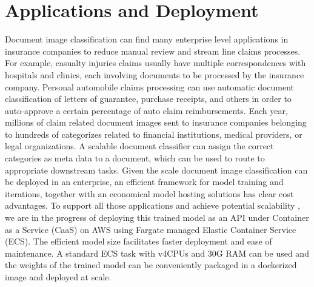 \section{Applications and Deployment}
Document image classification can find many enterprise level applications in insurance companies to reduce manual review and stream line claims processes. For example, casualty injuries claims usually have multiple correspondences with hospitals and clinics, each involving documents to be processed by the insurance company. Personal automobile claims processing can use automatic document classification of letters of guarantee, purchase receipts, and others in order to auto-approve a certain percentage of auto claim reimbursements. Each year, millions of claim related document images sent to insurance companies belonging to hundreds of categorizes related to financial institutions, medical providers, or legal organizations. A scalable document classifier can assign the correct categories as meta data to a document, which can be used to route to appropriate downstream tasks. Given the scale document image classification can be deployed in an enterprise, 
an efficient framework for model training and iterations, together with an economical model hosting solutions has clear cost advantages.  
To support all those applications and achieve potential scalability , we are in the progress of deploying this trained model as an API under Container as a Service (CaaS) on AWS using Fargate managed Elastic Container Service (ECS). The efficient model size facilitates faster deployment and ease of maintenance. A standard ECS task with v4CPUs and 30G RAM can be used and the weights of the trained model can be conveniently packaged in a dockerized image and deployed at scale. 









% 


